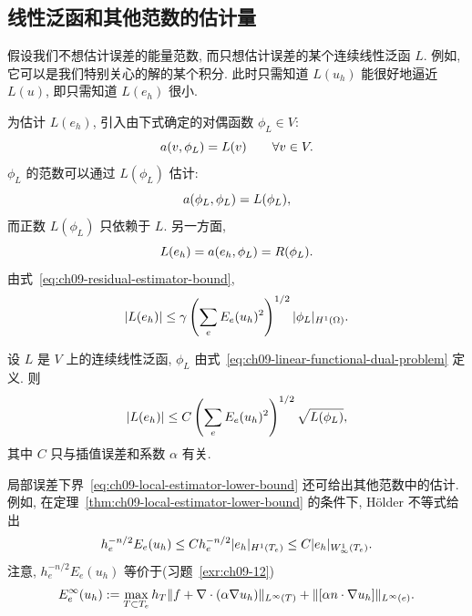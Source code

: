 \subsection{线性泛函和其他范数的估计量}
\label{sec:ch09-linear-functional-estimators}
\setcounter{thmcount}{0}
\setcounter{equation}{0}

假设我们不想估计误差的能量范数, 而只想估计误差的某个连续线性泛函 $L$. 例如, 它可以是我们特别关心的解的某个积分. 此时只需知道 $L(u_h)$ 能很好地逼近 $L(u)$, 即只需知道 $L(e_h)$ 很小.

为估计 $L(e_h)$, 引入由下式确定的对偶函数 $\phi_L\in V$:
\begin{equation}
\MathBookFormulaID{formula-ch09-linear-functional-dual-problem}
\label{eq:ch09-linear-functional-dual-problem}
a(v,\phi_L)=L(v)
\qquad\forall v\in V.
\end{equation}
$\phi_L$ 的范数可以通过 $L(\phi_L)$ 估计:
\begin{equation}
\MathBookFormulaID{formula-ch09-dual-energy-identity}
\label{eq:ch09-dual-energy-identity}
a(\phi_L,\phi_L)=L(\phi_L),
\end{equation}
而正数 $L(\phi_L)$ 只依赖于 $L$. 另一方面,
\[
\MathBookFormulaID{formula-ch09-linear-functional-residual-identity}
L(e_h)=a(e_h,\phi_L)=R(\phi_L).
\]
由式~\eqref{eq:ch09-residual-estimator-bound},
\[
\MathBookFormulaID{formula-ch09-linear-functional-estimator-intermediate}
|L(e_h)|\leq\gamma\left(\sum_eE_e(u_h)^2\right)^{1/2}|\phi_L|_{H^1(\Omega)}.
\]

\begin{Theorem}
\label{thm:ch09-linear-functional-estimator}
设 $L$ 是 $V$ 上的连续线性泛函, $\phi_L$ 由式~\eqref{eq:ch09-linear-functional-dual-problem} 定义. 则
\[
\MathBookFormulaID{formula-ch09-linear-functional-estimator}
|L(e_h)|\leq C\left(\sum_eE_e(u_h)^2\right)^{1/2}\sqrt{L(\phi_L)},
\]
其中 $C$ 只与插值误差和系数 $\alpha$ 有关.
\end{Theorem}

局部误差下界~\eqref{eq:ch09-local-estimator-lower-bound} 还可给出其他范数中的估计. 例如, 在定理~\ref{thm:ch09-local-estimator-lower-bound} 的条件下, Hölder 不等式给出
\[
\MathBookFormulaID{formula-ch09-local-infinity-estimator-scaling}
h_e^{-n/2}E_e(u_h)
\leq Ch_e^{-n/2}|e_h|_{H^1(T_e)}
\leq C|e_h|_{W_\infty^1(T_e)}.
\]
注意, $h_e^{-n/2}E_e(u_h)$ 等价于(习题~\ref{exr:ch09-12})
\begin{equation}
\MathBookFormulaID{formula-ch09-infinity-error-indicator}
\label{eq:ch09-infinity-error-indicator}
E_e^\infty(u_h):=
\max_{T\subset T_e}h_T\|f+\nabla\cdot(\alpha\nabla u_h)\|_{L^\infty(T)}
+\|[\alpha n\cdot\nabla u_h]\|_{L^\infty(e)}.
\end{equation}

